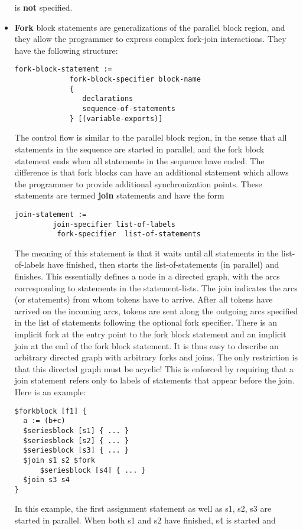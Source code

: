 \documentclass{article}
\begin{document}
\begin{itemize}
is {\bf not} specified.
\item {\bf Fork} block statements are generalizations of the
parallel block region, and they allow the programmer to express 
complex fork-join interactions.
They have the following structure:
\begin{verbatim}
fork-block-statement :=
             fork-block-specifier block-name
             {
                declarations
                sequence-of-statements
             } [(variable-exports)]
\end{verbatim}
The control flow is similar to the parallel block region,
in the sense that all statements in the sequence are started
in parallel, and the fork block statement ends when all statements
in the sequence have ended.  The difference is that
fork blocks can have an additional statement which
allows the programmer to provide additional synchronization
points.  These statements are termed {\bf join} statements
and have the form
\begin{verbatim}
join-statement :=
         join-specifier list-of-labels 
          fork-specifier  list-of-statements
\end{verbatim}
The meaning of this statement is that it waits until all statements
in the list-of-labels have finished, then starts the list-of-statements
(in parallel) and finishes.  This essentially defines a node in a directed graph,
with the arcs corresponding to statements in the statement-lists.  
The join indicates the arcs (or statements) 
from whom tokens have to arrive.  After all tokens have arrived
on the incoming arcs, tokens are sent along the outgoing arcs specified
in the list of statements following the optional fork specifier.  There is an implicit fork
at the entry point to the fork block statement and an implicit join at the
end of the fork block statement.  It is thus easy to describe
an arbitrary directed graph with arbitrary forks and joins.  The only
restriction is that this directed graph must be acyclic!  This is enforced
by requiring that a join statement refers only to labels of statements
that appear before the join.
Here is an example:
\begin{verbatim}
$forkblock [f1] {
  a := (b+c)
  $seriesblock [s1] { ... }
  $seriesblock [s2] { ... }
  $seriesblock [s3] { ... }
  $join s1 s2 $fork 
      $seriesblock [s4] { ... }
  $join s3 s4
}
\end{verbatim}
In this example, the first assignment statement as well as s1, s2, s3 are 
started in parallel. When both s1 and s2 have finished, s4 is started and

\end{itemize}
\end{document}
